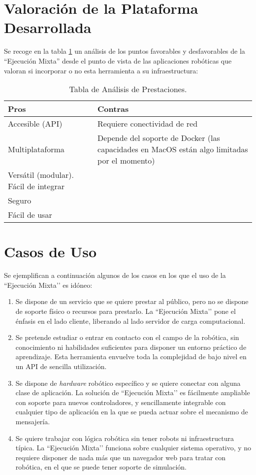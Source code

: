 \section{Valoración de la Plataforma Desarrollada}
Se recoge en la tabla \ref{tabla:prestaciones} un análisis de los puntos favorables y desfavorables de la ``Ejecución Mixta'' desde el punto de vista de las aplicaciones robóticas que valoran si incorporar o no esta herramienta a su infraestructura:

\clearpage
\begin{table}[htbp]
\begin{center}
\begin{tabular}{| p{5cm}| p{8cm} |}
\hline
Pros & Contras \\
\hline \hline
Accesible (API) & Requiere conectividad de red \\ \hline
Multiplataforma & Depende del soporte de Docker (las capacidades en MacOS están algo limitadas por el momento)\\ \hline
Versátil (modular). Fácil de integrar &   \\ \hline
Seguro &   \\ \hline
Fácil de usar &   \\ \hline
\end{tabular}
\caption{Tabla de Análisis de Prestaciones.}
\label{tabla:prestaciones}
\end{center}
\end{table}

\section{Casos de Uso }
Se ejemplifican a continuación algunos de los casos en los que el uso de la ``Ejecución Mixta’’ es idóneo:
\begin{enumerate}
\item Se dispone de un servicio que se quiere prestar al público, pero no se dispone de soporte físico o recursos para prestarlo. La ``Ejecución Mixta’’ pone el énfasis en el lado cliente, liberando al lado servidor de carga computacional.
\item Se pretende estudiar o entrar en contacto con el campo de la robótica, sin conocimiento ni habilidades suficientes para disponer un entorno práctico de aprendizaje. Esta herramienta envuelve toda la complejidad de bajo nivel en un API de sencilla utilización.
\item Se dispone de \textit{hardware} robótico específico y se quiere conectar con alguna clase de aplicación. La solución de ``Ejecución Mixta’’ es fácilmente ampliable con soporte para nuevos controladores, y sencillamente integrable con cualquier tipo de aplicación en la que se pueda actuar sobre el mecanismo de mensajería.
\item Se quiere trabajar con lógica robótica sin tener robots ni infraestructura típica. La ``Ejecución Mixta’’ funciona sobre cualquier sistema operativo, y no requiere disponer de nada más que un navegador web para tratar con robótica, en el que se puede tener soporte de simulación.
\end{enumerate}

